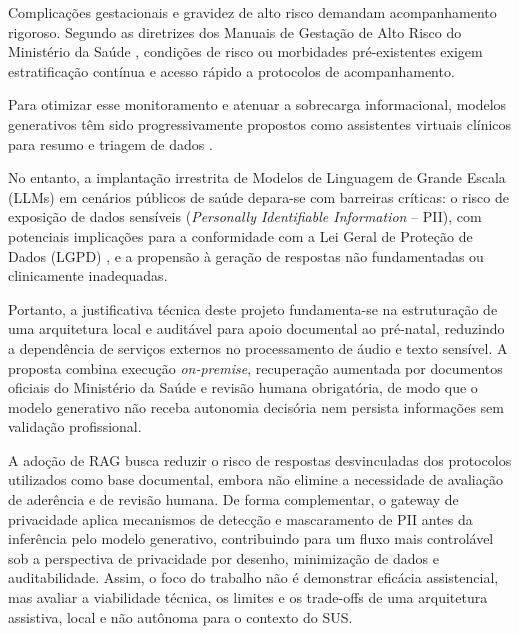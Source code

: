 \documentclass[12pt]{article}
\begin{document}

Complicações gestacionais e gravidez de alto risco demandam acompanhamento rigoroso.
Segundo as diretrizes dos Manuais de Gestação de Alto Risco do Ministério da Saúde \cite{ManualAltoRisco2022, ManualAltoRisco2012}, condições de risco ou morbidades pré-existentes exigem estratificação contínua e acesso rápido a protocolos de acompanhamento.

Para otimizar esse monitoramento e atenuar a sobrecarga informacional, modelos generativos têm sido progressivamente propostos como assistentes virtuais clínicos para resumo e triagem de dados \cite{Clusmann2023, Rajpurkar2022}.

No entanto, a implantação irrestrita de Modelos de Linguagem de Grande Escala (LLMs) em cenários públicos de saúde depara-se com barreiras críticas: o risco de exposição de dados sensíveis (\textit{Personally Identifiable Information} -- PII), com potenciais implicações para a conformidade com a Lei Geral de Proteção de Dados (LGPD) \cite{OWASPLLM2025, LGPD2018}, e a propensão à geração de respostas não fundamentadas ou clinicamente inadequadas.

Portanto, a justificativa técnica deste projeto fundamenta-se na estruturação de uma arquitetura local e auditável para apoio documental ao pré-natal, reduzindo a dependência de serviços externos no processamento de áudio e texto sensível.
A proposta combina execução \textit{on-premise}, recuperação aumentada por documentos oficiais do Ministério da Saúde e revisão humana obrigatória, de modo que o modelo generativo não receba autonomia decisória nem persista informações sem validação profissional.

A adoção de RAG busca reduzir o risco de respostas desvinculadas dos protocolos utilizados como base documental, embora não elimine a necessidade de avaliação de aderência e de revisão humana.
De forma complementar, o gateway de privacidade aplica mecanismos de detecção e mascaramento de PII antes da inferência pelo modelo generativo, contribuindo para um fluxo mais controlável sob a perspectiva de privacidade por desenho, minimização de dados e auditabilidade.
Assim, o foco do trabalho não é demonstrar eficácia assistencial, mas avaliar a viabilidade técnica, os limites e os trade-offs de uma arquitetura assistiva, local e não autônoma para o contexto do SUS.
\end{document}
